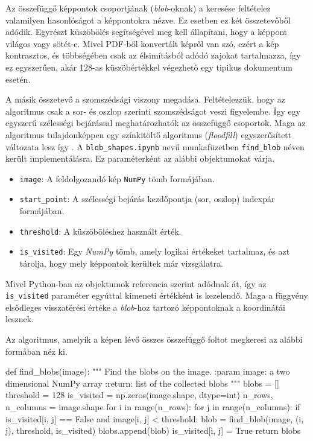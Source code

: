 Az összefüggő képpontok csoportjának (\textit{blob}-oknak) a keresése feltételez valamilyen hasonlóságot a képpontokra nézve. Ez esetben ez két összetevőből adódik. Egyrészt küszöbölés segítségével meg kell állapítani, hogy a képpont világos vagy sötét-e. Mivel PDF-ből konvertált képről van szó, ezért a kép kontrasztos, és többségében csak az élsimításból adódó zajokat tartalmazza, így ez egyszerűen, akár 128-as küszöbértékkel végezhető egy tipikus dokumentum esetén.

A másik összetevő a szomszédsági viszony megadása. Feltételezzük, hogy az algoritmus csak a sor- és oszlop szerinti szomszédságot veszi figyelembe. Így egy egyszerű szélességi bejárással meghatározhatók az összefüggő csoportok.
Maga az algoritmus tulajdonképpen egy színkitöltő algoritmus (\textit{floodfill}) egyszerűsített változata lesz így \cite{floodfill}.
A \texttt{blob\_shapes.ipynb} nevű munkafüzetben \texttt{find\_blob} néven került implementálásra.
Ez paraméterként az alábbi objektumokat várja.
\begin{itemize}
\item \texttt{image}: A feldolgozandó kép \texttt{NumPy} tömb formájában.
\item \texttt{start\_point}: A szélességi bejárás kezdőpontja (sor, oszlop) indexpár formájában.
\item \texttt{threshold}: A küszöböléshez használt érték.
\item \texttt{is\_visited}: Egy \textit{NumPy} tömb, amely logikai értékeket tartalmaz, és azt tárolja, hogy mely képpontok kerültek már vizsgálatra.
\end{itemize}
Mivel Python-ban az objektumok referencia szerint adódnak át, így az \texttt{is\_visited} paraméter egyúttal kimeneti értékként is kezelendő.
Maga a függvény elsődleges visszatérési értéke a \textit{blob}-hoz tartozó képpontoknak a koordinátái lesznek.

Az algoritmus, amelyik a képen lévő összes összefüggő foltot megkeresi az alábbi formában néz ki.
\begin{python}
def find_blobs(image):
    """
    Find the blobs on the image.
    :param image: a two dimensional NumPy array
    :return: list of the collected blobs
    """
    blobs = []
    threshold = 128
    is_visited = np.zeros(image.shape, dtype=int)
    n_rows, n_columns = image.shape
    for i in range(n_rows):
        for j in range(n_columns):
            if is_visited[i, j] == False and image[i, j] < threshold:
                blob = find_blob(image, (i, j), threshold, is_visited)
                blobs.append(blob)
            is_visited[i, j] = True
    return blobs
\end{python}

